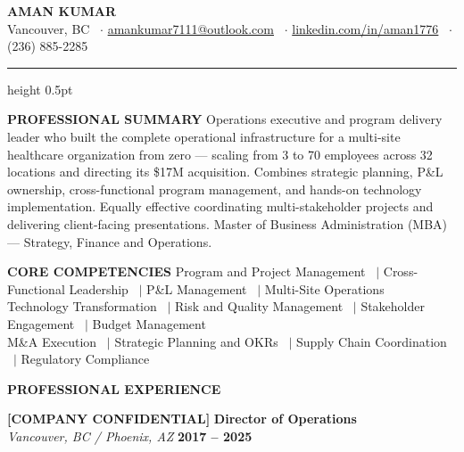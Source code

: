 \documentclass[10pt]{article}
\begin{document}
\begin{center}
{\LARGE \textbf{AMAN KUMAR}}\\[3pt]
Vancouver, BC \ $\cdot$ \href{amankumar7111@outlook.com}{amankumar7111@outlook.com} \ $\cdot$ \href{linkedin.com/in/aman1776}{linkedin.com/in/aman1776} \ $\cdot$ (236) 885-2285
\end{center}
\vspace{8pt}
\hrule height 0.5pt\relax
\vspace{6pt}

\noindent\textbf{PROFESSIONAL SUMMARY}\nopagebreak
\vspace{4pt}
\nopagebreak
Operations executive and program delivery leader who built the complete operational infrastructure for a multi-site healthcare organization from zero --- scaling from 3 to 70 employees across 32 locations and directing its \$17M acquisition. Combines strategic planning, P\&L ownership, cross-functional program management, and hands-on technology implementation. Equally effective coordinating multi-stakeholder projects and delivering client-facing presentations. Master of Business Administration (MBA) --- Strategy, Finance and Operations.

\vspace{8pt}
\noindent\textbf{CORE COMPETENCIES}\nopagebreak
\vspace{4pt}
\nopagebreak
Program and Project Management \ $|$ Cross-Functional Leadership \ $|$ P\&L Management \ $|$ Multi-Site Operations \\
Technology Transformation \ $|$ Risk and Quality Management \ $|$ Stakeholder Engagement \ $|$ Budget Management \\
M\&A Execution \ $|$ Strategic Planning and OKRs \ $|$ Supply Chain Coordination \ $|$ Regulatory Compliance

\vspace{8pt}
\noindent\textbf{PROFESSIONAL EXPERIENCE}\nopagebreak
\vspace{4pt}

\textbf{[COMPANY CONFIDENTIAL]} \hfill \textbf{Director of Operations} \\
\textit{Vancouver, BC / Phoenix, AZ} \hfill \textbf{2017 -- 2025}
\end{document}
